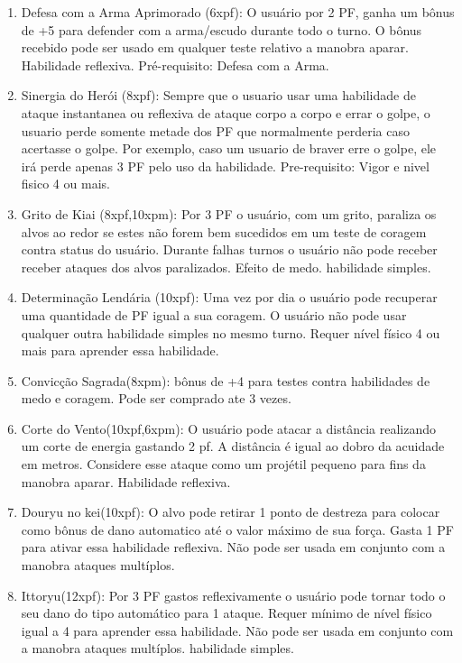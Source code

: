 \begin{enumerate}
	\item Defesa com a Arma Aprimorado (6xpf): O usuário por 2 PF, ganha um bônus de +5 para defender com a arma/escudo durante todo o turno. O bônus recebido pode ser usado em qualquer teste relativo a manobra aparar. Habilidade reflexiva. Pré-requisito: Defesa com a Arma.
	
	\item Sinergia do Herói (8xpf): Sempre que o usuario usar uma habilidade de ataque instantanea ou reflexiva de ataque corpo a corpo e errar o golpe, o usuario perde somente metade dos PF que normalmente perderia caso acertasse o golpe. Por exemplo, caso um usuario de braver erre o golpe, ele irá perde apenas 3 PF pelo uso da habilidade. Pre-requisito: Vigor e nivel fisico 4 ou mais.

	\item Grito de Kiai (8xpf,10xpm): Por 3 PF o usuário, com um grito, paraliza os alvos ao redor se estes não forem bem sucedidos em um teste de coragem contra status do usuário. Durante falhas turnos o usuário não pode receber receber ataques dos alvos paralizados. Efeito de medo. habilidade simples.

	\item Determinação Lendária (10xpf): Uma vez por dia o usuário pode recuperar uma quantidade de PF igual a sua coragem. O usuário não pode usar qualquer outra habilidade simples no mesmo turno. Requer nível físico 4 ou mais para aprender essa habilidade. 

	\item Convicção Sagrada(8xpm): bônus de +4 para testes contra habilidades de medo e coragem. Pode ser comprado ate 3 vezes.

	\item Corte do Vento(10xpf,6xpm): O usuário pode atacar a distância realizando um corte de energia gastando 2 pf. A distância é igual ao dobro da acuidade em metros. Considere esse ataque como um projétil pequeno para fins da manobra aparar. Habilidade reflexiva.
        
\item Douryu no kei(10xpf): O alvo pode retirar 1 ponto de destreza para colocar como bônus de dano automatico até o valor máximo de sua força. Gasta 1 PF para ativar essa habilidade reflexiva. Não pode ser usada em conjunto com a manobra ataques multíplos.

	\item Ittoryu(12xpf): Por 3 PF gastos reflexivamente o usuário pode tornar todo o seu dano do tipo automático para 1 ataque. Requer mínimo de nível físico igual a 4 para aprender essa habilidade. Não pode ser usada em conjunto com a manobra ataques multíplos. habilidade simples.
	

\end{enumerate}
